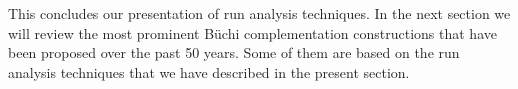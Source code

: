 This concludes our presentation of run analysis techniques. In the next section we will review the most prominent Büchi complementation constructions that have been proposed over the past 50 years. Some of them are based on the run analysis techniques that we have described in the present section.






